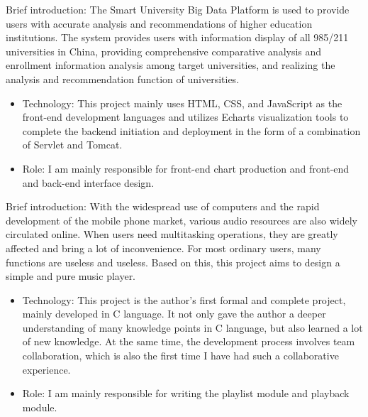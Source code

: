 \documentclass{resume}
\begin{document}
Brief introduction: The Smart University Big Data Platform is used to provide users with accurate analysis and recommendations of higher education institutions. The system provides users with information display of all 985/211 universities in China, providing comprehensive comparative analysis and enrollment information analysis among target universities, and realizing the analysis and recommendation function of universities.
\begin{itemize}
  \item Technology: This project mainly uses HTML, CSS, and JavaScript as the front-end development languages and utilizes Echarts visualization tools to complete the backend initiation and deployment in the form of a combination of Servlet and Tomcat.
  \item Role: I am mainly responsible for front-end chart production and front-end and back-end interface design.
\end{itemize}

Brief introduction: With the widespread use of computers and the rapid development of the mobile phone market, various audio resources are also widely circulated online. When users need multitasking operations, they are greatly affected and bring a lot of inconvenience. For most ordinary users, many functions are useless and useless. Based on this, this project aims to design a simple and pure music player.
\begin{itemize}
  \item Technology: This project is the author’s first formal and complete project, mainly developed in C language. It not only gave the author a deeper understanding of many knowledge points in C language, but also learned a lot of new knowledge. At the same time, the development process involves team collaboration, which is also the first time I have had such a collaborative experience.
  \item Role: I am mainly responsible for writing the playlist module and playback module.
\end{itemize}

\end{document}
